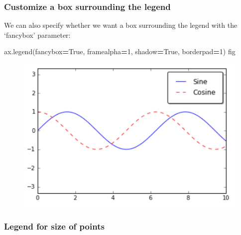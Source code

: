 \documentclass[]{book}
\newenvironment{Shaded}{\begin{snugshade}}{\end{snugshade}}
\newcommand{\DecValTok}[1]{\textcolor[rgb]{0.00,0.00,0.81}{#1}}
\newcommand{\VariableTok}[1]{\textcolor[rgb]{0.00,0.00,0.00}{#1}}
\newcommand{\OperatorTok}[1]{\textcolor[rgb]{0.81,0.36,0.00}{\textbf{#1}}}
\newcommand{\NormalTok}[1]{#1}
\theoremstyle{definition}
\theoremstyle{definition}
\theoremstyle{definition}
\theoremstyle{remark}
\begin{document}
\subsubsection{Customize a box surrounding the
legend}\label{customize-a-box-surrounding-the-legend}

We can also specify whether we want a box surrounding the legend with
the `fancybox' parameter:

\begin{Shaded}
\begin{Highlighting}[]
\NormalTok{ax.legend(fancybox}\OperatorTok{=}\VariableTok{True}\NormalTok{, framealpha}\OperatorTok{=}\DecValTok{1}\NormalTok{, shadow}\OperatorTok{=}\VariableTok{True}\NormalTok{, borderpad}\OperatorTok{=}\DecValTok{1}\NormalTok{)}
\NormalTok{fig}
\end{Highlighting}
\end{Shaded}

\begin{figure}
\centering
\includegraphics{images/legend3.png}
\caption{}
\end{figure}

\subsubsection{Legend for size of
points}\label{legend-for-size-of-points}
\end{document}
